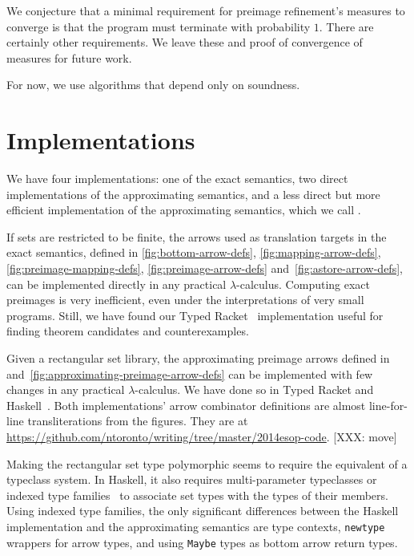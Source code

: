 We conjecture that a minimal requirement for preimage refinement's measures to converge is that the program must terminate with probability $1$.
There are certainly other requirements.
We leave these and proof of convergence of measures for future work.

For now, we use algorithms that depend only on soundness.


\section{Implementations}
\label{sec:implementation}

We have four implementations: one of the exact semantics, two direct implementations of the approximating semantics, and a less direct but more efficient implementation of the approximating semantics, which we call .

If sets are restricted to be finite, the arrows used as translation targets in the exact semantics, defined in \ref{fig:bottom-arrow-defs}, \ref{fig:mapping-arrow-defs}, \ref{fig:preimage-mapping-defs}, \ref{fig:preimage-arrow-defs} and~\ref{fig:astore-arrow-defs}, can be implemented directly in any practical $\lambda$-calculus.
Computing exact preimages is very inefficient, even under the interpretations of very small programs.
Still, we have found our Typed Racket~\cite{cit:tobin-hochstadt-2008popl-typed-scheme} implementation useful for finding theorem candidates and counterexamples.

Given a rectangular set library, the approximating preimage arrows defined in  and~\ref{fig:approximating-preimage-arrow-defs} can be implemented with few changes in any practical $\lambda$-calculus.
We have done so in Typed Racket and Haskell~\cite{cit:haskell-lang}.
Both implementations' arrow combinator definitions are almost line-for-line transliterations from the figures.
They are at \url{https://github.com/ntoronto/writing/tree/master/2014esop-code}. [XXX: move]

Making the rectangular set type polymorphic seems to require the equivalent of a typeclass system.
In Haskell, it also requires multi-parameter typeclasses or indexed type families~\cite{cit:chakravarty-2005popl-type-families} to associate set types with the types of their members.
Using indexed type families, the only significant differences between the Haskell implementation and the approximating semantics are type contexts, \texttt{newtype} wrappers for arrow types, and using \texttt{Maybe} types as bottom arrow return types.

